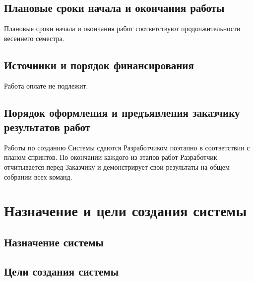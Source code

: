 \documentclass[a4paper, 12pt]{article}		%
\begin{document}
\subsection{Плановые сроки начала и окончания работы}
Плановые сроки начала и окончания работ соответствуют продолжительности весеннего семестра.

\subsection{Источники и порядок финансирования}
Работа оплате не подлежит.

\subsection{Порядок оформления и предъявления заказчику результатов работ}

Работы по созданию Системы сдаются Разработчиком поэтапно в соответствии с планом спринтов. По окончании каждого из этапов работ Разработчик отчитывается перед Заказчику и демонстрирует свои результаты на общем собрании всех команд.

\newpage
\section{Назначение и цели создания системы}
\subsection{Назначение системы}


\subsection{Цели создания системы}

\end{document}
